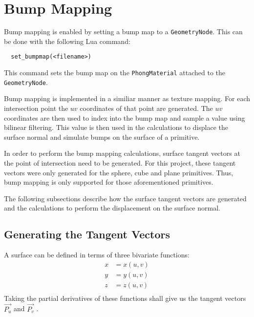 \section{Bump Mapping}

Bump mapping is enabled by setting a bump map to a \verb|GeometryNode|. This can
be done with the following Lua command:
\begin{lstlisting}
  set_bumpmap(<filename>)
\end{lstlisting}
This command sets the bump map on the \verb|PhongMaterial| attached to the
\verb|GeometryNode|.

Bump mapping is implemented in a similiar manner as texture mapping. For each
intersection point the $uv$ coordinates of that point are generated. The $uv$
coordinates are then used to index into the bump map and sample a value
using bilinear filtering. This value is then used in the calculations to
displace the surface normal and simulate bumps on the surface of a primitive.

In order to perform the bump mapping calculations, surface tangent vectors at
the point of intersection need to be generated. For this project, these tangent
vectors were only generated for the sphere, cube and plane primitives. Thus,
bump mapping is only supported for those aforementioned primitives.

The following subsections describe how the surface tangent vectors are generated
and the calculations to perform the displacement on the surface normal.

\subsection{Generating the Tangent Vectors}
A surface can be defined in terms of three bivariate functions:
\begin{equation}
\begin{split}
  x &= x(u, v) \\
  y &= y(u, v) \\
  z &= z(u, v) \\
\end{split}
\end{equation}
Taking the partial derivatives of these functions shall give us the tangent
vectors $\vec{P_{u}}$ and $\vec{P_{v}}$ \cite{Blinn-1978}.

